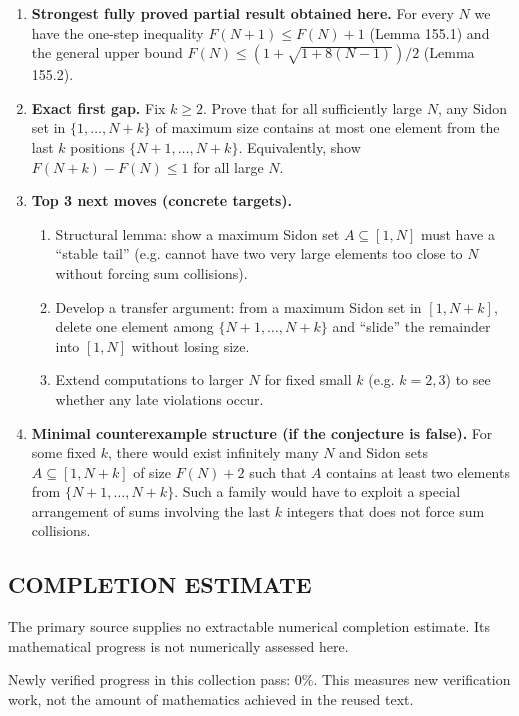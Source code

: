 \begin{enumerate}
\item[(i)] \textbf{Strongest fully proved partial result obtained here.}
For every $N$ we have the one-step inequality $F(N+1)\le F(N)+1$ (Lemma 155.1) and the general upper bound $F(N)\le (1+\sqrt{1+8(N-1)})/2$ (Lemma 155.2).

\item[(ii)] \textbf{Exact first gap.}
Fix $k\ge 2$. Prove that for all sufficiently large $N$, any Sidon set in $\{1,\dots,N+k\}$ of maximum size contains at most one element from the last $k$ positions $\{N+1,\dots,N+k\}$. Equivalently, show $F(N+k)-F(N)\le 1$ for all large $N$.

\item[(iii)] \textbf{Top 3 next moves (concrete targets).}
\begin{enumerate}
\item Structural lemma: show a maximum Sidon set $A\subseteq[1,N]$ must have a ``stable tail'' (e.g. cannot have two very large elements too close to $N$ without forcing sum collisions).
\item Develop a transfer argument: from a maximum Sidon set in $[1,N+k]$, delete one element among $\{N+1,\dots,N+k\}$ and ``slide'' the remainder into $[1,N]$ without losing size.
\item Extend computations to larger $N$ for fixed small $k$ (e.g. $k=2,3$) to see whether any late violations occur.
\end{enumerate}

\item[(iv)] \textbf{Minimal counterexample structure (if the conjecture is false).}
For some fixed $k$, there would exist infinitely many $N$ and Sidon sets $A\subseteq[1,N+k]$ of size $F(N)+2$ such that $A$ contains at least two elements from $\{N+1,\dots,N+k\}$. Such a family would have to exploit a special arrangement of sums involving the last $k$ integers that does not force sum collisions.
\end{enumerate}




\subsection*{COMPLETION ESTIMATE}
The primary source supplies no extractable numerical completion estimate. Its mathematical progress is not numerically assessed here.

Newly verified progress in this collection pass: $0\%$. This measures new verification work, not the amount of mathematics achieved in the reused text.
